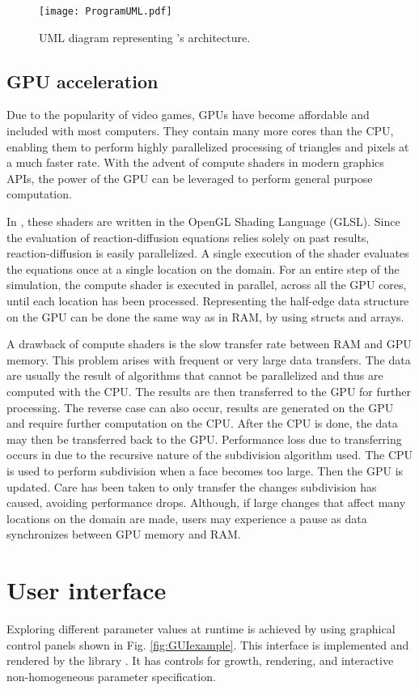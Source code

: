 \begin{figure}[H]
	\centering
	\texttt{[image: ProgramUML.pdf]}
	\caption{UML diagram representing \ProgramName{}'s architecture.}
	\label{fig:umlDiagram}
\end{figure}

\subsection{GPU acceleration}
Due to the popularity of video games, GPUs have become affordable and included with most computers. They contain many more cores than the CPU, enabling them to perform highly parallelized processing of triangles and pixels at a much faster rate. With the advent of compute shaders in modern graphics APIs, the power of the GPU can be leveraged to perform general purpose computation. 

In \ProgramName{}, these shaders are written in the OpenGL Shading Language (GLSL). Since the evaluation of reaction-diffusion equations relies solely on past results, reaction-diffusion is easily parallelized. A single execution of the shader evaluates the equations once at a single location on the domain. For an entire step of the simulation, the compute shader is executed in parallel, across all the GPU cores, until each location has been processed. Representing the half-edge data structure on the GPU can be done the same way as in RAM, by using structs and arrays.

A drawback of compute shaders is the slow transfer rate between RAM and GPU memory. This problem arises with frequent or very large data transfers. The data are usually the result of algorithms that cannot be parallelized and thus are computed with the CPU. The results are then transferred to the GPU for further processing. The reverse case can also occur, results are generated on the GPU and require further computation on the CPU. After the CPU is done, the data may then be transferred back to the GPU. Performance loss due to transferring occurs in \ProgramName{} due to the recursive nature of the subdivision algorithm used. The CPU is used to perform subdivision when a face becomes too large. Then the GPU is updated. Care has been taken to only transfer the changes subdivision has caused, avoiding performance drops. Although, if large changes that affect many locations on the domain are made, users may experience a pause as data synchronizes between GPU memory and RAM. 

\section{User interface}
Exploring different parameter values at runtime is achieved by using graphical control panels shown in Fig. \ref{fig:GUIexample}. This interface is implemented and rendered by the library  \citep{cornut2019}. It has controls for growth, rendering, and interactive non-homogeneous parameter specification. 

